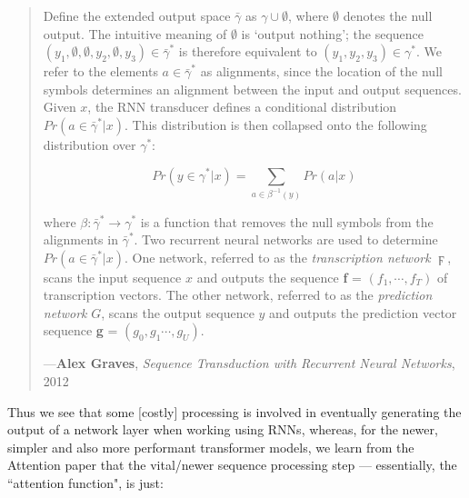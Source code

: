 \documentclass[a4paper, 18pt]{book} %
\begin{document}
\begin{appendices}
\begin{minipage}{1\textwidth}
\begin{quotation}
{}
\end{quotation}
\vspace{1em}
\end{minipage}

\vspace{2em}


\noindent
\begin{minipage}{1\textwidth}
\vspace{1em}
\begin{quotation}
{\ttfamily


Define the extended output space  $\bar{\gamma}$ as $\gamma \cup \emptyset$, where $\emptyset$ denotes the null output. The intuitive meaning of $\emptyset$ is `output nothing'; the sequence $(y_1, \emptyset, \emptyset, y_2, \emptyset, y_3) \in \bar{\gamma}^*$ is therefore equivalent to $(y_1, y_2, y_3) \in  \gamma^*$. We refer to the elements $a \in \bar{\gamma}^*$ as alignments, since the location of the null symbols determines an alignment between the input and output sequences. Given $x$, the RNN transducer defines a conditional distribution $Pr(a \in \bar{\gamma}^*|x)$. This distribution is then collapsed onto the following distribution over $\gamma^*$:

\begin{equation}
Pr(y \in \gamma^*|x) = \sum\limits_{a \in \beta^{-1}(y)} Pr(a|x)
\end{equation}

where $\beta : \bar{\gamma}^*  \rightarrow \gamma^*$ is a function that removes the null
symbols from the alignments in  $\bar{\gamma}^*$. Two recurrent neural networks are used to determine $Pr(a \in \bar{\gamma}^*|x)$. One network, referred to as the \textit{transcription network} $\digamma$, scans the input sequence $x$ and outputs the sequence \textbf{f} = $(f_1, \cdots , f_T )$ of transcription vectors. The other network, referred to as the \textit{prediction network} $G$, scans the output sequence $y$ and outputs the prediction vector sequence \textbf{g} = $(g_0, g_1 \cdots , g_U )$.

}
\hspace*{\fill} ---\textbf{Alex Graves}, \textit{Sequence Transduction with Recurrent Neural Networks}, 2012\cite{Graves2012}
\end{quotation}
\vspace{1em}
\end{minipage}

\vspace{2em}


Thus we see that some [costly] processing is involved in eventually generating the output of a network layer when working using RNNs, whereas, for the newer, simpler and also more performant transformer models\cite{Vaswani2017}, we learn from the Attention paper that the vital/newer sequence processing step --- essentially, the ``attention function", is just:\\



\end{appendices}
\end{document}
